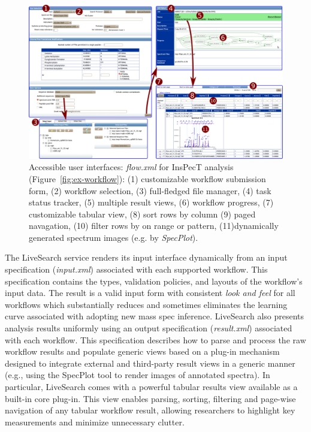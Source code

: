 \documentclass[arial,11pt]{article}
\newcommand{\SF}[1]{\textsf{#1}}
\newcommand{\SYSTEM}[0]{\SF{ProteoSAFe}\xspace}
\newcommand{\LiveSearch}[0]{\SF{LiveSearch}\xspace}
\begin{document}
\begin{figure}[ht]
  \includegraphics[width=\textwidth]{figures/access.pdf}
  \caption{\footnotesize Accessible user interfaces:
{\em  flow.xml} for InsPecT analysis (Figure~\ref{fig:ex-workflow}):
   (1) customizable workflow submission form,
   (2) workflow selection,
   (3) full-fledged file manager,
   (4) task status tracker,
   (5) multiple result views,
   (6) workflow progress,
   (7) customizable tabular view,
   (8) sort rows by column
   (9) paged navagation,
   (10) filter rows by on range or pattern,
   (11)dynamically generated spectrum images (e.g. by {\em  SpecPlot}).
}
  \label{fig:acc}
\end{figure}
The \LiveSearch service renders its input interface dynamically from an input specification ({\em  input.xml}) associated with each supported workflow.
This specification contains the types, validation policies, and layouts of the workflow's input data. The result is a valid input form with consistent {\em  look and feel} for all workflows which substantially reduces and sometimes eliminates the learning curve associated with adopting new mass spec inference.
\LiveSearch also presents analysis results uniformly using an output specification ({\em  result.xml}) associated with each workflow.
This specification describes how to parse and process the raw workflow results and populate generic views
based on a plug-in mechanism designed to integrate external and third-party result views in a generic manner (e.g., using the SpecPlot tool to render images of annotated spectra).
In particular, \LiveSearch comes with a powerful tabular results view available as a built-in core plug-in. This view enables parsing, sorting, filtering and page-wise navigation of any tabular workflow result, allowing researchers to highlight key measurements and minimize unnecessary clutter.
\end{document}
